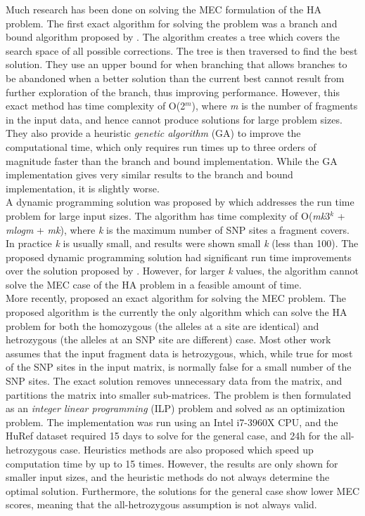 \documentclass[10pt,twocolumn]{witseiepaper}
\newcommand{\K}{\textit{k }}
\newcommand{\M}{\textit{m }}
\begin{document}
Much research has been done on solving the MEC formulation of the HA problem. The first exact algorithm for
solving the problem was a branch and bound algorithm proposed by \cite{wang:2005}. The algorithm creates a
tree which covers the search space of all possible corrections. The tree is then traversed to find the best
solution. They use an upper bound for when branching that allows branches to be abandoned when a better
solution than the current best cannot result from further exploration of the branch, thus improving
performance. However, this exact method has time complexity of O(2$^{\textit{m}}$), where \M is the
number of fragments in the input data, and hence cannot produce solutions for large problem sizes. They also 
provide a heuristic \textit{genetic algorithm} (GA) to improve the computational time, which only requires 
run times up to three orders of magnitude faster than the branch and bound implementation. While the GA
implementation gives very similar results to the branch and bound implementation, it is slightly worse. \\
A dynamic programming solution was proposed by \cite{xie:2008} which addresses the run time problem for large
input sizes. The algorithm has time complexity of O(\textit{mk}3$^{\textit{k}}$ + \textit{mlogm} +
\textit{mk}), where \K is the maximum number of SNP sites a fragment covers. In practice \K is usually small,
and results were shown small \K (less than 100). The proposed dynamic programming solution had significant run
time improvements over the solution proposed by \cite{wang:2005}. However, for larger \K values, the 
algorithm cannot solve the MEC case of the HA problem in a feasible amount of time. \\
More recently, \cite{chen:2013} proposed an exact algorithm for solving the MEC problem. The proposed
algorithm is the currently the only algorithm which can solve the HA problem for both the homozygous (the 
alleles at a site are identical) and hetrozygous (the alleles at an SNP site are different) case. Most other 
work assumes that the input fragment data is hetrozygous, which, while true for most of the SNP sites in the
input matrix, is normally false for a small number of the SNP sites. The exact solution removes unnecessary
data from the matrix, and partitions the matrix into smaller sub-matrices. The problem is then formulated as
an \textit{integer linear programming} (ILP) problem and solved as an optimization problem. The implementation was
run using an Intel i7-3960X CPU, and the HuRef dataset required 15 days to solve for the general case, and 24h
for the all-hetrozygous case. Heuristics methods are also proposed which speed up computation time by up to 15
times. However, the results are only shown for smaller input sizes, and the heuristic methods do not always
determine the optimal solution. Furthermore, the solutions for the general case show lower MEC scores, meaning
that the all-hetrozygous assumption is not always valid. 
\end{document}
